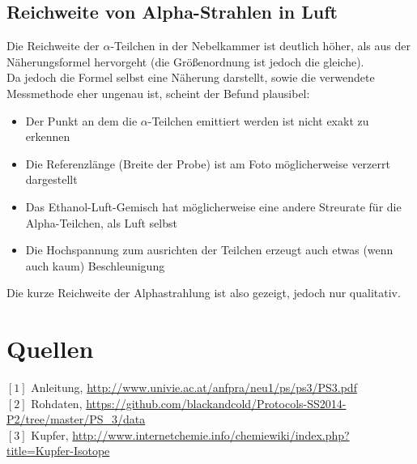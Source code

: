 \documentclass[12pt,a4paper]{article}
\begin{document}
\begin{multicols}{2}
\subsection{Reichweite von Alpha-Strahlen in Luft}

Die Reichweite der $\alpha$-Teilchen in der Nebelkammer ist deutlich höher, als aus der Näherungsformel hervorgeht (die Größenordnung ist jedoch die gleiche).\\

Da jedoch die Formel selbst eine Näherung darstellt, sowie die verwendete Messmethode eher ungenau ist,  scheint der Befund plausibel:\\
\begin{itemize}
\item Der Punkt an dem die $\alpha$-Teilchen emittiert werden ist nicht exakt zu erkennen
\item Die Referenzlänge (Breite der Probe) ist am Foto möglicherweise verzerrt dargestellt
\item Das Ethanol-Luft-Gemisch hat möglicherweise eine andere Streurate für die Alpha-Teilchen, als Luft selbst
\item Die Hochspannung zum ausrichten der Teilchen erzeugt auch etwas (wenn auch kaum) Beschleunigung
\end{itemize}

Die kurze Reichweite der Alphastrahlung ist also gezeigt, jedoch nur qualitativ.


\section{Quellen}
$[1]$ Anleitung, \url{http://www.univie.ac.at/anfpra/neu1/ps/ps3/PS3.pdf}\\
$[2]$ Rohdaten, \url{https://github.com/blackandcold/Protocols-SS2014-P2/tree/master/PS_3/data}\\
$[3]$ Kupfer, \url{http://www.internetchemie.info/chemiewiki/index.php?title=Kupfer-Isotope}
\end{multicols}
\end{document}
